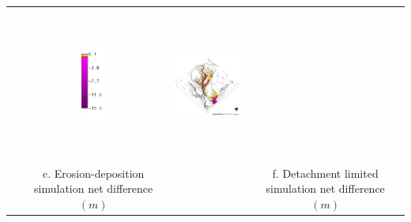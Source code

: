 \documentclass{standalone}
\begin{document}
\begin{tabular}{m{} m{} m{} m{}}
& \multicolumn{1}{c}{\includegraphics[height=25mm]{../../images/ss_flux_3d/legend_difference.png}}
& \multicolumn{1}{c}{\includegraphics[height=50mm]{../../images/ss_flux_3d/difference_carto.png}}\\
\multicolumn{1}{c}{} 
& \multicolumn{1}{c}{c. Erosion-deposition simulation net difference $(m)$} 
& \multicolumn{1}{c}{} 
& \multicolumn{1}{c}{f. Detachment limited simulation net difference $(m)$}\\
%
\end{tabular}
\end{document}
